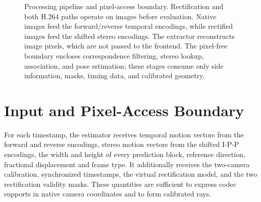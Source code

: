\begin{figure}[htbp]
{}
  \caption[Processing pipeline and pixel-access boundary]{Processing pipeline and pixel-access boundary. Rectification and
  both H.264 paths operate on images before evaluation. Native images feed the
  forward/reverse temporal encodings, while rectified images feed the shifted
  stereo encodings. The extractor reconstructs image pixels, which are not
  passed to the frontend. The pixel-free boundary encloses correspondence
  filtering, stereo lookup, association, and pose estimation; these stages
  consume only side information, masks, timing data, and calibrated geometry.}
  \label{fig:system-pipeline}
\end{figure}

\section{Input and Pixel-Access Boundary}

For each timestamp, the estimator receives temporal motion vectors from the
forward and reverse encodings, stereo motion vectors from the shifted I-P-P
encodings, the width and height of every prediction block, reference direction,
fractional displacement and frame type. It additionally receives the two-camera
calibration, synchronized timestamps, the virtual rectification model, and the
two rectification validity masks. These quantities are sufficient to express
codec supports in native camera coordinates and to form calibrated rays.

